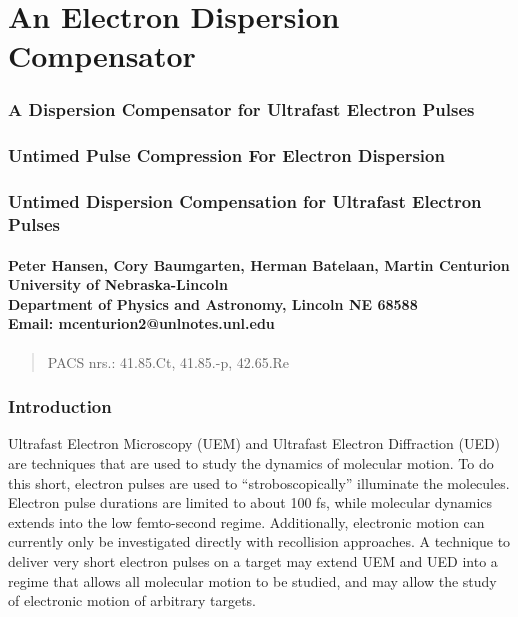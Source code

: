 \documentclass[12pt,letterpaper]{article}
\begin{document}
{
\centering
\part*{An Electron Dispersion Compensator}
\section*{A Dispersion Compensator for Ultrafast Electron Pulses}
\section*{Untimed Pulse Compression For Electron Dispersion}
\section*{Untimed Dispersion Compensation for Ultrafast Electron Pulses}

\subsection*{Peter Hansen, Cory Baumgarten, Herman Batelaan, Martin Centurion\\
University of Nebraska-Lincoln\\
Department of Physics and Astronomy, Lincoln NE 68588\\
Email: mcenturion2@unlnotes.unl.edu}
}

\begin{abstract}
   PACS nrs.: 41.85.Ct, 41.85.-p, 42.65.Re
\end{abstract}

   \section{Introduction}

Ultrafast Electron Microscopy (UEM) and Ultrafast Electron Diffraction (UED) are techniques that are used to study the dynamics of molecular motion. 
To do this short, electron pulses are used to ``stroboscopically'' illuminate the molecules. 
Electron pulse durations are limited to about 100 fs, while molecular dynamics extends into the low femto-second regime. 
Additionally, electronic motion can currently only be investigated directly with recollision approaches. 
A technique to deliver very short electron pulses on a target may extend UEM and UED into a regime that allows all molecular motion to be studied, and may allow the study of electronic motion of arbitrary targets.
\end{document}
